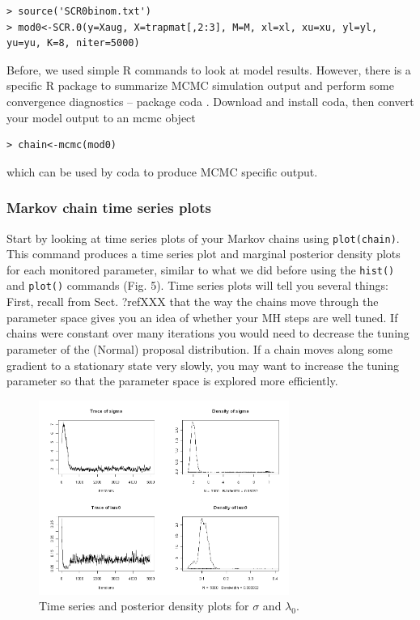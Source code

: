 \begin{verbatim}
> source('SCR0binom.txt')
> mod0<-SCR.0(y=Xaug, X=trapmat[,2:3], M=M, xl=xl, xu=xu, yl=yl, yu=yu, K=8, niter=5000)
\end{verbatim}

Before, we used simple R commands to look at model results. However, there is a specific R package to summarize MCMC simulation output and perform some convergence diagnostics -- package coda \citep{plummer_etal:2006}. Download and install coda, then convert your model output to an mcmc object
\begin{verbatim}
> chain<-mcmc(mod0)
\end{verbatim} which can be used by coda to produce MCMC specific output.

\subsubsection{Markov chain time series plots}
Start by looking at time series plots of your Markov chains using \verb#plot(chain)#. This command produces a time series plot and marginal posterior density plots for each monitored parameter, similar to what we did before using the \verb#hist()# and \verb#plot()# commands (Fig. 5). Time series plots will tell you several things:
First, recall from Sect. ?ref{XXX} that the way the chains move through the parameter space gives you an idea of whether your MH steps are well tuned. If chains were constant over many iterations you would need to decrease the tuning parameter of the (Normal) proposal distribution. If a chain moves along some gradient to a stationary state very slowly, you may want to increase the tuning parameter so that the parameter space is explored more efficiently.


\begin{figure}
\begin{center}
\includegraphics[height=2.5in]{Ch6/figs/timeseries}
\end{center}
\caption{Time series and posterior density plots for $\sigma$ and $\lambda_0$.}
\label{timeseries.fig}
\end{figure}


